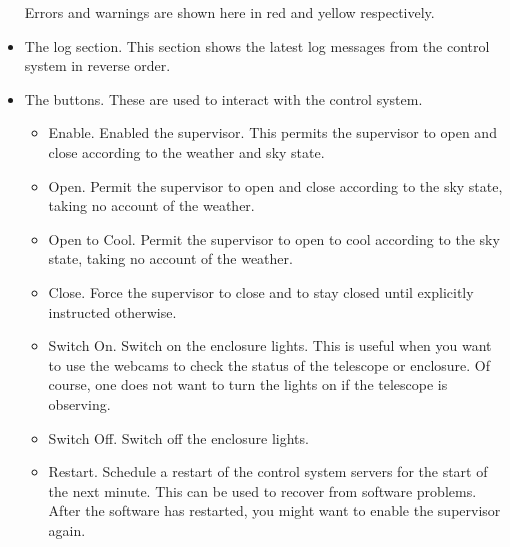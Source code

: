 \begin{itemize}
Errors and warnings are shown here in red and yellow respectively.
\item
The log section. This section shows the latest log messages from the control system in reverse order.
\item
The buttons. These are used to interact with the control system.
\begin{itemize}
\item
Enable. Enabled the supervisor. This permits the supervisor to open and close according to the weather and sky state.
\item
Open. Permit the supervisor to open and close according to the sky state, taking no account of the weather. 
\item
Open to Cool. Permit the supervisor to open to cool according to the sky state, taking no account of the weather. 
\item
Close. Force the supervisor to close and to stay closed until explicitly instructed otherwise.
\label{interface-close-button}
\item
Switch On. Switch on the enclosure lights. This is useful when you want to use the webcams to check the status of the telescope or enclosure. Of course, one does not want to turn the lights on if the telescope is observing.
\label{interface-switch-on-button}
\item
Switch Off. Switch off the enclosure lights. 
\label{interface-switch-off-button}

\item
Restart. Schedule a restart of the control system servers for the start of the next minute. This can be used to recover from software problems. After the software has restarted, you might want to enable the supervisor again.
\label{interface-restart-button}

\end{itemize}
\end{itemize}

